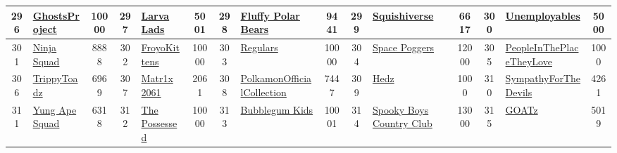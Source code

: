 \begin{table*}[]
{\begin{tabular}{|c|l|c|c|l|c|c|l|c|c|l|c|c|l|c|}
        296   & \href{https://ghostsproject.com}{GhostsProject}                                    & 10000             & 297   & \href{http://larvalads.com}{Larva Lads}                                                           & 5001              & 298   & \href{https://polarbearsnft.com/}{Fluffy Polar Bears}                             & 9441              & 299   & \href{https://squishiverse.com}{Squishiverse}                                 & 6617              & 300   & \href{http://twitter.com/unemployables}{Unemployables}                                    & 5000                                    \\ \hline
        301   & \href{http://ninjasquad.co}{Ninja Squad}                                           & 8888              & 302   & \href{http://froyoverse.io}{FroyoKittens}                                                         & 10000             & 303   & \href{https://regular.world}{Regulars}                                            & 10000             & 304   & \href{http://spacepoggers.com}{Space Poggers}                                 & 12000             & 305   & \href{https://yusukehanai.fwenclub.com/}{PeopleInThePlaceTheyLove}                        & 1000                                    \\ \hline
        306   & \href{https://www.trippytoadz.io/}{TrippyToadz}                                    & 6969              & 307   & \href{https://matr1x.io/}{Matr1x 2061}                                                            & 2061              & 308   & \href{https://polychainmonsters.com}{PolkamonOfficialCollection}                  & 7447              & 309   & \href{http://www.hedz.fun}{Hedz}                                              & 1000              & 310   & \href{https://sympathyforthedevils.club/}{SympathyForTheDevils}                           & 4261                                    \\ \hline
        311   & \href{https://yungapesquad.com/}{Yung Ape Squad}                                   & 6318              & 312   & \href{https://p4sd.com}{The Possessed}                                                            & 10000             & 313   & \href{http://bubblegumkids.com}{Bubblegum Kids}                                   & 10001             & 314   & \href{https://www.spookyboys.io/}{Spooky Boys Country Club}                   & 13000             & 315   & \href{https://maisondegoat.com/}{GOATz}                                                   & 5019                                    \\ \hline

\end{tabular}}
\end{table*}
